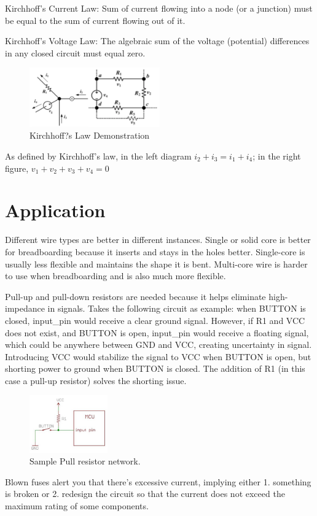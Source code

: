 \documentclass{article}
\begin{document}
Kirchhoff's Current Law: Sum of current flowing into a node (or a junction) must be equal to the sum of current flowing out of it. \par
Kirchhoff's Voltage Law: The algebraic sum of the voltage (potential) differences in any closed circuit must equal zero.

\begin{figure}[!h]
	\center
	\includegraphics[width=0.5\textwidth, keepaspectratio]{kirchof_demo}
	\caption{Kirchhoff?s Law Demonstration}
	\label{fig:kirchof_demo}
\end{figure}
As defined by Kirchhoff's law, in the left diagram $i_2+i_3=i_1+i_4$; in the right figure, $v_1+v_2+v_3+v_4=0$

\section{Application}

Different wire types are better in different instances. Single or solid core is better for breadboarding because it inserts and stays in the holes better. Single-core is usually less flexible and maintains the shape it is bent. Multi-core wire is harder to use when breadboarding and is also much more flexible. \par

Pull-up and pull-down resistors are needed because it helps eliminate high-impedance in signals. Takes the following circuit as example: when BUTTON is closed, input\_pin would receive a clear ground signal. However, if R1 and VCC does not exist, and BUTTON is open, input\_pin would receive a floating signal, which could be anywhere between GND and VCC, creating uncertainty in signal. Introducing VCC would stabilize the signal to VCC when BUTTON is open, but shorting power to ground when BUTTON is closed. The addition of R1 (in this case a pull-up resistor) solves the shorting issue.

\begin{figure}[!h]
	\center
	\includegraphics[width=0.3\textwidth, keepaspectratio]{pull}
	\caption{Sample Pull resistor network.}
	\label{fig:pull}
\end{figure}

Blown fuses alert you that there's excessive current, implying either 1. something is broken or 2. redesign the circuit so that the current does not exceed the maximum rating of some components.
\end{document}
